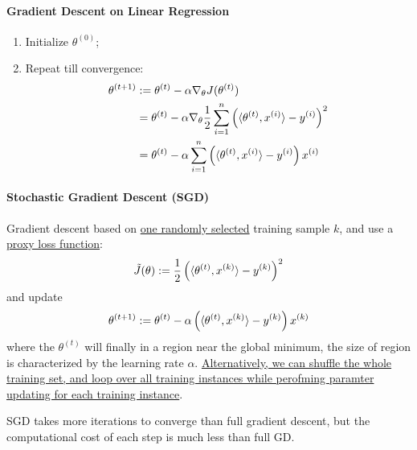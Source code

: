 \documentclass{report}
\begin{document}
        \paragraph{Gradient Descent on Linear Regression}
        \begin{enumerate}
            \item Initialize $\theta^{(0)}$;
            \item Repeat till convergence:
            \begin{align}
                \theta^{(t+1)} &:= \theta^{(t)} - \alpha \nabla_\theta J(\theta^{(t)}) \\
                &= \theta^{(t)} - \alpha \nabla_\theta \frac{1}{2} \sum_{i=1}^n \left( \langle {\theta^{(t)}}, {x^{(i)}} \rangle - y^{(i)} \right )^2 \\
                &= \theta^{(t)} - \alpha \sum_{i=1}^n \left( \langle {\theta^{(t)}}, {x^{(i)}} \rangle - y^{(i)} \right ) x^{(i)}
            \end{align}
        \end{enumerate}
        
        \paragraph{Stochastic Gradient Descent (SGD)} Gradient descent based on \ul{one randomly selected} training sample $k$, and use a \ul{proxy loss function}:
        \begin{align}
            \tilde{J}(\theta) := \frac{1}{2} \left( \langle {\theta^{(t)}}, {x^{(k)}} \rangle - y^{(k)} \right )^2
        \end{align}
        and update
        \begin{align}
            \theta^{(t+1)} := \theta^{(t)} - \alpha \left( \langle {\theta^{(t)}}, {x^{(k)}} \rangle - y^{(k)} \right ) x^{(k)}
        \end{align}
        where the $\theta^{(t)}$ will finally in a region near the global minimum, the size of region is characterized by the learning rate $\alpha$. \ul{Alternatively, we can shuffle the whole training set, and loop over all training instances while perofming paramter updating for each training instance}.
        \begin{remark}
            SGD takes more iterations to converge than full gradient descent, but the computational cost of each step is much less than full GD.
        \end{remark}
\end{document}
